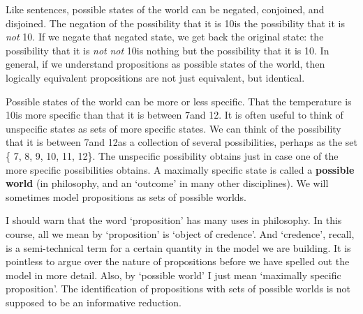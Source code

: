 Like sentences, possible states of the world can be negated, conjoined, and
disjoined. The negation of the possibility that it is 10\celsius is the
possibility that it is \emph{not} 10\celsius. If we negate that negated state,
we get back the original state: the possibility that it is \emph{not} \emph{not}
10\celsius is nothing but the possibility that it is 10\celsius. In general, if
we understand propositions as possible states of the world, then logically
equivalent propositions are not just equivalent, but identical.


Possible states of the world can be more or less specific. That the temperature
is 10\celsius is more specific than that it is between 7\celsius and 12\celsius.
It is often useful to think of unspecific states as sets of more specific
states. We can think of the possibility that it is between 7\celsius and
12\celsius as a collection of several possibilities, perhaps as the set \{
7\celsius, 8\celsius, 9\celsius, 10\celsius, 11\celsius, 12\celsius \}. The
unspecific possibility obtains just in case one of the more specific
possibilities obtains. A maximally specific state is called a \textbf{possible
  world} (in philosophy, and an `outcome' in many other disciplines). We will
sometimes model propositions as sets of possible worlds.

I should warn that the word `proposition' has many uses in philosophy. In this
course, all we mean by `proposition' is `object of credence'. And `credence',
recall, is a semi-technical term for a certain quantity in the model we are
building. It is pointless to argue over the nature of propositions before we
have spelled out the model in more detail. Also, by `possible world' I just mean
`maximally specific proposition'. The identification of propositions with sets
of possible worlds is not supposed to be an informative reduction.

